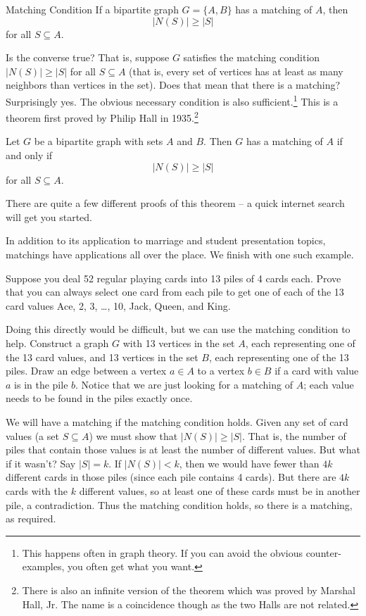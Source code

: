 \documentclass[12pt]{article}
\begin{document}
\begin{defbox}{Matching Condition}
If a bipartite graph $G = \{A, B\}$ has a matching of $A$, then 
\[|N(S)| \ge |S|\]
for all $S \subseteq A$.
\end{defbox}

Is the converse true?  That is, suppose $G$ satisfies the matching condition $|N(S)| \ge |S|$ for all $S \subseteq A$ (that is, every set of vertices has at least as many neighbors than vertices in the set).  Does that mean that there is a matching?  Surprisingly yes.  The obvious necessary condition is also sufficient.\footnote{This happens often in graph theory.  If you can avoid the obvious counter-examples, you often get what you want.}  This is a theorem first proved by Philip Hall in 1935.\footnote{There is also an infinite version of the theorem which was proved by Marshal Hall, Jr.  The name is a coincidence though as the two Halls are not related.}

\begin{theorem}
Let $G$ be a bipartite graph with sets $A$ and $B$.  Then $G$ has a matching of $A$ if and only if
\[|N(S)| \ge |S|\]
for all $S \subseteq A$.
\end{theorem}

There are quite a few different proofs of this theorem -- a quick internet search will get you started.  

In addition to its application to marriage and student presentation topics, matchings have applications all over the place.  We finish with one such example.

\begin{example}
Suppose you deal 52 regular playing cards into 13 piles of 4 cards each.  Prove that you can always select one card from each pile to get one of each of the 13 card values Ace, 2, 3, \ldots, 10, Jack, Queen, and King.

\begin{solution}
	Doing this directly would be difficult, but we can use the matching condition to help.  Construct a graph $G$ with 13 vertices in the set $A$, each representing one of the 13 card values, and 13 vertices in the set $B$, each representing one of the 13 piles.  Draw an edge between a vertex $a \in A$ to a vertex $b \in B$ if a card with value $a$ is in the pile $b$.  Notice that we are just looking for a matching of $A$; each value needs to be found in the piles exactly once.
	
	We will have a matching if the matching condition holds.  Given any set of card values (a set $S \subseteq A$) we must show that $|N(S)| \ge |S|$.  That is, the number of piles that contain those values is at least the number of different values. But what if it wasn't?  Say $|S| = k$.  If $|N(S)| < k$, then we would have fewer than $4k$ different cards in those piles (since each pile contains 4 cards).  But there are $4k$ cards with the $k$ different values, so at least one of these cards must be in another pile, a contradiction.  Thus the matching condition holds, so there is a matching, as required.
\end{solution}

\end{example}
\end{document}
